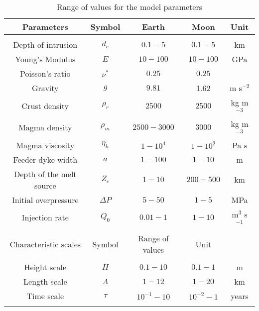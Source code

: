 \begin{table}
  \caption{Range of values for the model parameters}
  \centering
  \begin{tabular}{c|c|c|c|c}
    Parameters& Symbol & Earth & Moon&Unit\\
    \hline
    &&&&\\
    Depth of intrusion & $d_c$ & $0.1-5$ &$0.1-5$ &km \\
    Young's Modulus & $E$ & $10-100$ &$10-100$ &GPa \\
    Poisson's ratio & $\nu^*$ & $0.25$ &$0.25$ &\\
    Gravity & $g$ & $9.81$ &1.62&m s$^{-2}$ \\
    Crust density & $\rho_{r}$ & $2500$ &$2500$&kg m$^{-3}$ \\
    Magma density & $\rho_{m}$ & $2500-3000$ &$3000$&kg m$^{-3}$ \\
    Magma viscosity & $\eta_h $ & $1-10^{4}$ &$1-10^{2}$&Pa s \\
    Feeder dyke width & $a$ & $1-100$ &$1-10$&m \\
    Depth of the melt source & $Z_{c}$ & $ 1-10$&$200-500$& km \\ 
    Initial overpressure & $\Delta P$ & $5-50$ &$1-5$ &MPa \\
    Injection rate & $Q_{0}$ &$0.01-1$ &$1-10$&m$^{3}$ s$^{-1}$ \\
              &&&&\\
    \hline
    Characteristic scales & Symbol & Range of values & Unit\\
    \hline
              &&&&\\
    Height scale & $H$& $0.1-10$ &$0.1-1$ &m \\
    Length scale & $\Lambda$ & $1-12$&$1-20$& km \\
    Time scale & $\tau$ & $10^{-1}-10$&$10^{-2}-1$& years \\
    \label{tab2}
  \end{tabular} 
\end{table}


